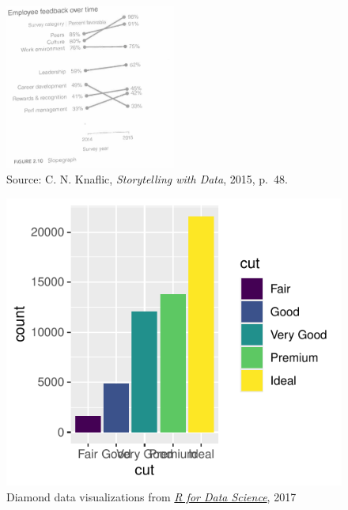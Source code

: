 \documentclass[
  letterpaper,
  DIV=11,
  numbers=noendperiod]{scrreprt}
\begin{document}
\begin{figure}[H]

{\centering \includegraphics[width=0.5\textwidth,height=\textheight]{src/../images/slopegraph1.png}

}

\caption{Source: C. N. Knaflic, \emph{Storytelling with Data}, 2015,
p.~48.}

\end{figure}%

\hfill\break
\hfill\break
\hfill\break

\begin{figure}[H]

{\centering \includegraphics{src/03-Effective_Viz_files/figure-pdf/unnamed-chunk-11-1.pdf}

}

\caption{Diamond data visualizations from
\href{http://r4ds.had.co.nz/data-visualisation.html\#position-adjustments}{\emph{R
for Data Science}}, 2017}

\end{figure}%
\end{document}

